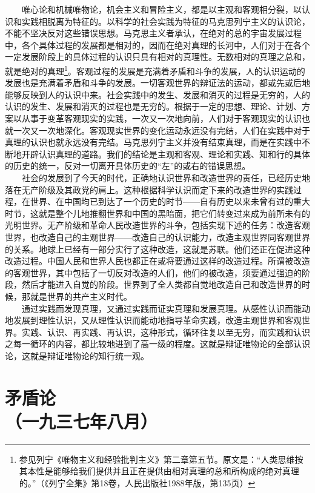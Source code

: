 \documentclass[cn,11pt,chinese]{elegantbook}
\def\myformat#1{\hfil\hfil #1}
\begin{document}
　　唯心论和机械唯物论，机会主义和冒险主义，都是以主观和客观相分裂，以认识和实践相脱离为特征的。以科学的社会实践为特征的马克思列宁主义的认识论，不能不坚决反对这些错误思想。马克思主义者承认，在绝对的总的宇宙发展过程中，各个具体过程的发展都是相对的，因而在绝对真理的长河中，人们对于在各个一定发展阶段上的具体过程的认识只具有相对的真理性。无数相对的真理之总和，就是绝对的真理\footnote[11]{ 参见列宁《唯物主义和经验批判主义》第二章第五节。原文是：“人类思维按其本性是能够给我们提供并且正在提供由相对真理的总和所构成的绝对真理的。”（《列宁全集》第18卷，人民出版社1988年版，第135页）}。客观过程的发展是充满着矛盾和斗争的发展，人的认识运动的发展也是充满着矛盾和斗争的发展。一切客观世界的辩证法的运动，都或先或后地能够反映到人的认识中来。社会实践中的发生、发展和消灭的过程是无穷的，人的认识的发生、发展和消灭的过程也是无穷的。根据于一定的思想、理论、计划、方案以从事于变革客观现实的实践，一次又一次地向前，人们对于客观现实的认识也就一次又一次地深化。客观现实世界的变化运动永远没有完结，人们在实践中对于真理的认识也就永远没有完结。马克思列宁主义并没有结束真理，而是在实践中不断地开辟认识真理的道路。我们的结论是主观和客观、理论和实践、知和行的具体的历史的统一，反对一切离开具体历史的“左”的或右的错误思想。\\
　　社会的发展到了今天的时代，正确地认识世界和改造世界的责任，已经历史地落在无产阶级及其政党的肩上。这种根据科学认识而定下来的改造世界的实践过程，在世界、在中国均已到达了一个历史的时节——自有历史以来未曾有过的重大时节，这就是整个儿地推翻世界和中国的黑暗面，把它们转变过来成为前所未有的光明世界。无产阶级和革命人民改造世界的斗争，包括实现下述的任务：改造客观世界，也改造自己的主观世界——改造自己的认识能力，改造主观世界同客观世界的关系。地球上已经有一部分实行了这种改造，这就是苏联。他们还正在促进这种改造过程。中国人民和世界人民也都正在或将要通过这样的改造过程。所谓被改造的客观世界，其中包括了一切反对改造的人们，他们的被改造，须要通过强迫的阶段，然后才能进入自觉的阶段。世界到了全人类都自觉地改造自己和改造世界的时候，那就是世界的共产主义时代。\\
　　通过实践而发现真理，又通过实践而证实真理和发展真理。从感性认识而能动地发展到理性认识，又从理性认识而能动地指导革命实践，改造主观世界和客观世界。实践、认识、再实践、再认识，这种形式，循环往复以至无穷，而实践和认识之每一循环的内容，都比较地进到了高一级的程度。这就是辩证唯物论的全部认识论，这就是辩证唯物论的知行统一观。\\
\newpage\section*{\myformat{矛盾论}\\\myformat{（一九三七年八月）}}
\end{document}
